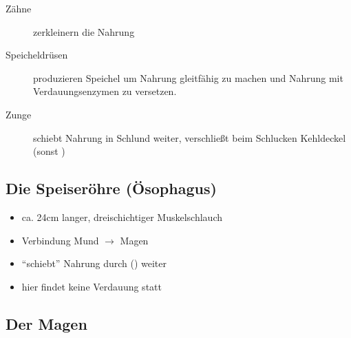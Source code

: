 \begin{description}
    \item[Zähne] zerkleinern die Nahrung
    \item[Speicheldrüsen] produzieren Speichel um Nahrung
    gleitfähig zu machen und Nahrung mit Verdauungsenzymen  zu versetzen.
    \item[Zunge] schiebt Nahrung in Schlund weiter,
    verschließt beim Schlucken Kehldeckel (sonst  )
\end{description}



\subsection{Die Speiseröhre (Ösophagus)}

\gMarried
{
\begin{itemize}
    \item ca. 24cm langer, dreischichtiger Muskelschlauch
    \item Verbindung Mund $\rightarrow$ Magen
    \item "`schiebt"' Nahrung durch
    () weiter
    \item hier findet keine Verdauung statt
\end{itemize}
}
{

\centering
{}




}




\subsection{Der Magen}


